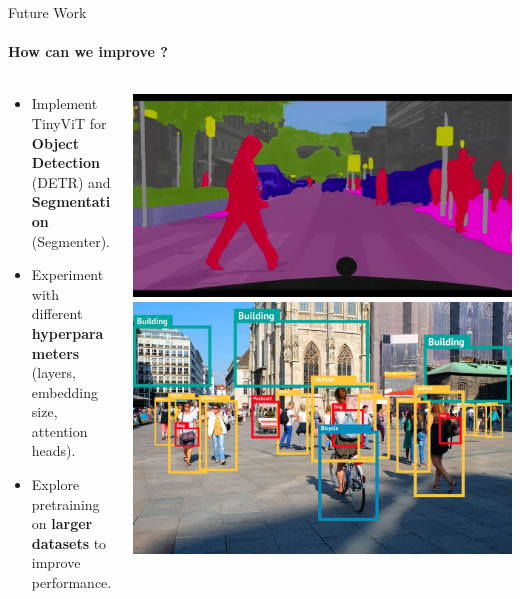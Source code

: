 \begin{frame}[fragile]{Future Work}
  \framesubtitle{How can we improve ?}
  \begin{columns}
    \begin{column}{0.7\textwidth}
      \begin{itemize}
        \item Implement TinyViT for \textbf{Object Detection} (DETR) and \textbf{Segmentation} (Segmenter).
        \item Experiment with different \textbf{hyperparameters} (layers, embedding size, attention heads).
        \item Explore pretraining on \textbf{larger datasets} to improve performance.
      \end{itemize}
    \end{column}
    \begin{column}{0.3\textwidth}
      \includegraphics[width=\textwidth]{images/segmentation.png}
      \includegraphics[width=\textwidth]{images/objectdetection.jpg}
    \end{column}
  \end{columns}
\end{frame}